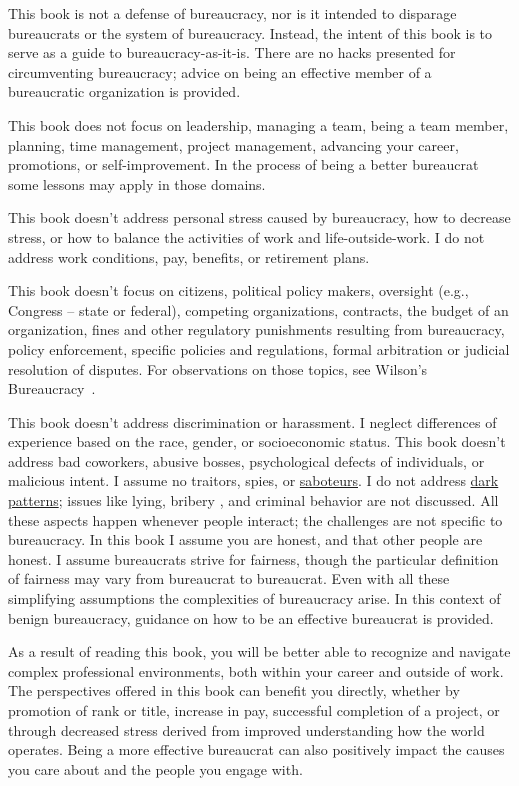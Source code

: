 This book is not a defense of bureaucracy, nor is it intended to disparage bureaucrats or the system of bureaucracy. Instead, the intent of this book is to serve as a guide to bureaucracy-as-it-is. There are no hacks presented for circumventing bureaucracy; advice on being an effective member of a bureaucratic organization is provided.

This book does not focus on leadership, managing a team, being a team member, planning, time management, project management, advancing your career, promotions, or self-improvement. In the process of being a better bureaucrat some lessons may apply in those domains.

This book doesn't address personal stress caused by bureaucracy, how to decrease stress, or how to balance the activities of work and life-outside-work.  I do not address work conditions, pay, benefits, or retirement plans.


This book doesn't focus on citizens, political policy makers, oversight (e.g., Congress -- state or federal), competing organizations, contracts, the budget of an organization, fines and other regulatory punishments resulting from bureaucracy, policy enforcement, specific policies and regulations, formal arbitration or judicial resolution of disputes. For observations on those topics, see Wilson's Bureaucracy~\cite{1991_Wilson}.

This book doesn't address discrimination or harassment. I neglect differences of experience based on the race, gender, or socioeconomic status. This book doesn't address bad coworkers, abusive bosses, psychological defects of individuals, or malicious intent. I assume no traitors, spies, or \href{https://www.hsdl.org/?abstract&did=750070}{saboteurs}.
I do not address \href{https://en.wikipedia.org/wiki/Dark_pattern}{dark patterns}; issues like lying, bribery \cite{2021_Ang}, and criminal behavior are not discussed. All these aspects happen whenever people interact; the challenges are not specific to bureaucracy. In this book I assume you are honest, and that other people are honest.  
I assume bureaucrats strive for fairness, though the particular definition of fairness may vary from bureaucrat to bureaucrat. 
Even with all these simplifying assumptions the complexities of bureaucracy arise. In this context of benign bureaucracy, guidance on how to be an effective bureaucrat is provided.


As a result of reading this book, you will be better able to recognize and navigate complex professional environments, both within your career and outside of work. The perspectives offered in this book can benefit you directly, whether by promotion of rank or title, increase in pay, successful completion of a project, or through decreased stress derived from improved understanding how the world operates. Being a more effective bureaucrat can also positively impact the causes you care about and the people you engage with.


